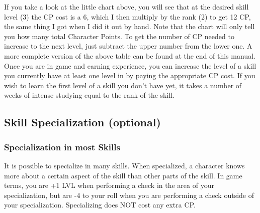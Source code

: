 \documentclass[twoside]{book}
\begin{document}
   If you take a look at the little chart above, you will
             see that at the desired skill level (3) the CP cost is a 6,
             which I then multiply by the rank (2) to get 12 CP, the same
             thing I got when I did it out by hand.  Note that the chart will only tell you how many total
             Character Points. To get the number of CP needed to increase
             to the next level, just subtract the upper number from the
             lower one. A more complete version of the above table can be
             found at the end of this manual.  Once you are in game and earning experience, you can
             increase the level of a skill you currently have at least
             one level in by paying the appropriate CP cost. If you wish
             to learn the first level of a skill you don't have
             yet, it takes a number of weeks of intense studying equal to
             the rank of the skill. 
    

\subsection{Skill Specialization (optional)}
    
    

\subsubsection{Specialization in most Skills}
     It is possible to specialize in many skills. When
                 specialized, a character knows more about a certain
                 aspect of the skill than other parts of the skill. In
                 game terms, you are +1 LVL when performing a check in
                 the area of your specialization, but are -4 to your roll
                 when you are performing a check outside of your
                 specialization. Specializing does NOT cost any extra CP.
                 
  

  
\end{document}
